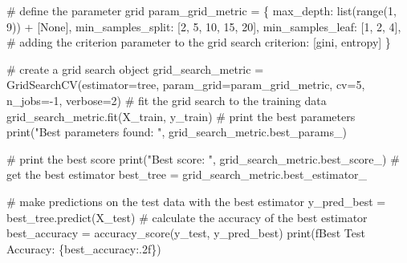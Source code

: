 \documentclass[
  letterpaper,
  DIV=11,
  numbers=noendperiod]{scrreprt}
\newenvironment{Shaded}{\begin{snugshade}}{\end{snugshade}}
\newcommand{\BuiltInTok}[1]{\textcolor[rgb]{0.00,0.23,0.31}{#1}}
\newcommand{\CommentTok}[1]{\textcolor[rgb]{0.37,0.37,0.37}{#1}}
\newcommand{\DecValTok}[1]{\textcolor[rgb]{0.68,0.00,0.00}{#1}}
\newcommand{\NormalTok}[1]{\textcolor[rgb]{0.00,0.23,0.31}{#1}}
\newcommand{\OperatorTok}[1]{\textcolor[rgb]{0.37,0.37,0.37}{#1}}
\newcommand{\SpecialCharTok}[1]{\textcolor[rgb]{0.37,0.37,0.37}{#1}}
\newcommand{\SpecialStringTok}[1]{\textcolor[rgb]{0.13,0.47,0.30}{#1}}
\newcommand{\StringTok}[1]{\textcolor[rgb]{0.13,0.47,0.30}{#1}}
\newcommand{\VariableTok}[1]{\textcolor[rgb]{0.07,0.07,0.07}{#1}}
\begin{document}
\begin{Shaded}
\begin{Highlighting}[]
\CommentTok{\# define the parameter grid}
\NormalTok{param\_grid\_metric }\OperatorTok{=}\NormalTok{ \{}
    \StringTok{\textquotesingle{}max\_depth\textquotesingle{}}\NormalTok{: }\BuiltInTok{list}\NormalTok{(}\BuiltInTok{range}\NormalTok{(}\DecValTok{1}\NormalTok{, }\DecValTok{9}\NormalTok{)) }\OperatorTok{+}\NormalTok{ [}\VariableTok{None}\NormalTok{], }
    \StringTok{\textquotesingle{}min\_samples\_split\textquotesingle{}}\NormalTok{: [}\DecValTok{2}\NormalTok{, }\DecValTok{5}\NormalTok{, }\DecValTok{10}\NormalTok{, }\DecValTok{15}\NormalTok{, }\DecValTok{20}\NormalTok{],}
    \StringTok{\textquotesingle{}min\_samples\_leaf\textquotesingle{}}\NormalTok{: [}\DecValTok{1}\NormalTok{, }\DecValTok{2}\NormalTok{, }\DecValTok{4}\NormalTok{],}
    \CommentTok{\# adding the criterion parameter to the grid search}
    \StringTok{\textquotesingle{}criterion\textquotesingle{}}\NormalTok{: [}\StringTok{\textquotesingle{}gini\textquotesingle{}}\NormalTok{, }\StringTok{\textquotesingle{}entropy\textquotesingle{}}\NormalTok{]}
\NormalTok{\}}

\CommentTok{\# create a grid search object}
\NormalTok{grid\_search\_metric }\OperatorTok{=}\NormalTok{ GridSearchCV(estimator}\OperatorTok{=}\NormalTok{tree, param\_grid}\OperatorTok{=}\NormalTok{param\_grid\_metric, cv}\OperatorTok{=}\DecValTok{5}\NormalTok{, n\_jobs}\OperatorTok{={-}}\DecValTok{1}\NormalTok{, verbose}\OperatorTok{=}\DecValTok{2}\NormalTok{)}
\CommentTok{\# fit the grid search to the training data}
\NormalTok{grid\_search\_metric.fit(X\_train, y\_train)}
\CommentTok{\# print the best parameters}
\BuiltInTok{print}\NormalTok{(}\StringTok{"Best parameters found: "}\NormalTok{, grid\_search\_metric.best\_params\_)}

\CommentTok{\# print the best score}
\BuiltInTok{print}\NormalTok{(}\StringTok{"Best score: "}\NormalTok{, grid\_search\_metric.best\_score\_)}
\CommentTok{\# get the best estimator}
\NormalTok{best\_tree }\OperatorTok{=}\NormalTok{ grid\_search\_metric.best\_estimator\_}

\CommentTok{\# make predictions on the test data with the best estimator}
\NormalTok{y\_pred\_best }\OperatorTok{=}\NormalTok{ best\_tree.predict(X\_test)}
\CommentTok{\# calculate the accuracy of the best estimator}
\NormalTok{best\_accuracy }\OperatorTok{=}\NormalTok{ accuracy\_score(y\_test, y\_pred\_best)}
\BuiltInTok{print}\NormalTok{(}\SpecialStringTok{f\textquotesingle{}Best Test Accuracy: }\SpecialCharTok{\{}\NormalTok{best\_accuracy}\SpecialCharTok{:.2f\}}\SpecialStringTok{\textquotesingle{}}\NormalTok{)}
\end{Highlighting}
\end{Shaded}
\end{document}
